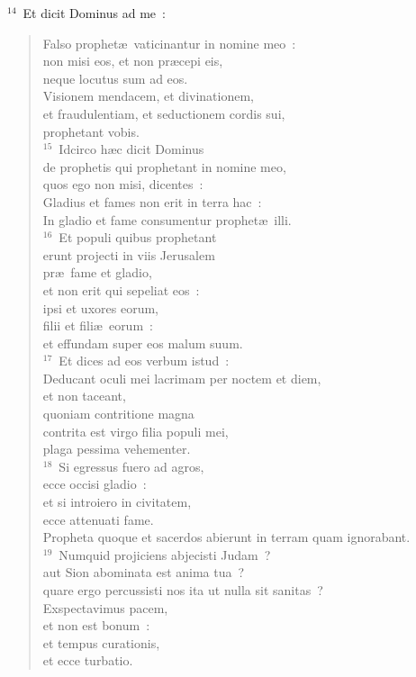 ${}^{14}$~Et dicit Dominus ad me~: \begin{verse}Falso prophet\ae\ vaticinantur in nomine meo~:\\ non misi eos, et non pr\ae cepi eis,\\ neque locutus sum ad eos.\\ Visionem mendacem, et divinationem,\\ et fraudulentiam, et seductionem cordis sui,\\ prophetant vobis.\\
${}^{15}$~Idcirco h\ae c dicit Dominus\\ de prophetis qui prophetant in nomine meo,\\ quos ego non misi, dicentes~:\\ Gladius et fames non erit in terra hac~:\\ In gladio et fame consumentur prophet\ae\ illi.\\
${}^{16}$~Et populi quibus prophetant\\ erunt projecti in viis Jerusalem\\ pr\ae\ fame et gladio,\\ et non erit qui sepeliat eos~:\\ ipsi et uxores eorum,\\ filii et fili\ae\ eorum~:\\ et effundam super eos malum suum.\\
${}^{17}$~Et dices ad eos verbum istud~:\\ Deducant oculi mei lacrimam per noctem et diem,\\ et non taceant,\\ quoniam contritione magna\\ contrita est virgo filia populi mei,\\ plaga pessima vehementer.\\
${}^{18}$~Si egressus fuero ad agros,\\ ecce occisi gladio~:\\ et si introiero in civitatem,\\ ecce attenuati fame.\\ Propheta quoque et sacerdos abierunt in terram quam ignorabant.\\
${}^{19}$~Numquid projiciens abjecisti Judam~?\\ aut Sion abominata est anima tua~?\\ quare ergo percussisti nos ita ut nulla sit sanitas~?\\ Exspectavimus pacem,\\ et non est bonum~:\\ et tempus curationis,\\ et ecce turbatio.\\

\end{verse}
